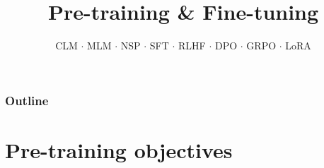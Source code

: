 \documentclass[aspectratio=169]{beamer}
\title{Pre-training \& Fine-tuning}
\subtitle{CLM $\cdot$ MLM $\cdot$ NSP $\cdot$ SFT $\cdot$ RLHF $\cdot$ DPO $\cdot$ GRPO $\cdot$ LoRA}
\date{}
\begin{document}
\begin{frame}
\titlepage
\end{frame}

\begin{frame}
\frametitle{Outline}
\tableofcontents
\end{frame}

\section{Pre-training objectives}
\end{document}
